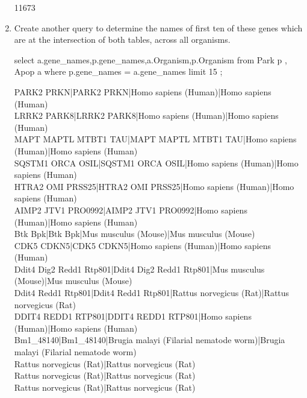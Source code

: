 \documentclass{report}
\begin{document}
\begin{enumerate}
11673


\item Create another query to determine the names of first ten of these genes which
are at the intersection of both tables, across all organisms.

select a.gene\_names,p.gene\_names,a.Organism,p.Organism from Park p , Apop a where p.gene\_names = a.gene\_names limit 15 ;




PARK2 PRKN|PARK2 PRKN|Homo sapiens (Human)|Homo sapiens (Human)\\
LRRK2 PARK8|LRRK2 PARK8|Homo sapiens (Human)|Homo sapiens (Human)\\
MAPT MAPTL MTBT1 TAU|MAPT MAPTL MTBT1 TAU|Homo sapiens (Human)|Homo sapiens (Human)\\
SQSTM1 ORCA OSIL|SQSTM1 ORCA OSIL|Homo sapiens (Human)|Homo sapiens (Human)\\
HTRA2 OMI PRSS25|HTRA2 OMI PRSS25|Homo sapiens (Human)|Homo sapiens (Human)\\
AIMP2 JTV1 PRO0992|AIMP2 JTV1 PRO0992|Homo sapiens (Human)|Homo sapiens (Human)\\
Btk Bpk|Btk Bpk|Mus musculus (Mouse)|Mus musculus (Mouse)\\
CDK5 CDKN5|CDK5 CDKN5|Homo sapiens (Human)|Homo sapiens (Human)\\
Ddit4 Dig2 Redd1 Rtp801|Ddit4 Dig2 Redd1 Rtp801|Mus musculus (Mouse)|Mus musculus (Mouse)\\
Ddit4 Redd1 Rtp801|Ddit4 Redd1 Rtp801|Rattus norvegicus (Rat)|Rattus norvegicus (Rat)\\
DDIT4 REDD1 RTP801|DDIT4 REDD1 RTP801|Homo sapiens (Human)|Homo sapiens (Human)\\
Bm1\_48140|Bm1\_48140|Brugia malayi (Filarial nematode worm)|Brugia malayi (Filarial nematode worm)\\
Rattus norvegicus (Rat)|Rattus norvegicus (Rat)\\
Rattus norvegicus (Rat)|Rattus norvegicus (Rat)\\
Rattus norvegicus (Rat)|Rattus norvegicus (Rat)\\



\end{enumerate}
\end{document}
